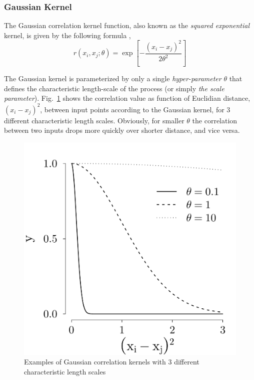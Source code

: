 
\subsubsection{Gaussian Kernel}\label{subsub:gp_gaussian_cov}

The Gaussian correlation kernel function, also known as the \emph{squared exponential} kernel, is given by the following formula \cite{Roustant2012,Santner2003,Rasmussen2006},
\begin{equation}
	r(x_i, x_j; \theta) = \exp{\left[- \frac{(x_i - x_j)^2}{2 \theta^2}\right]}
\label{eq:gaussian_kernel}
\end{equation}

The Gaussian kernel is parameterized by only a single \emph{hyper-parameter} $\theta$ that defines the characteristic length-scale of the process (or simply \emph{the scale parameter}).
Fig.~\ref{fig:plot_corrfun_gauss} shows the correlation value as function of Euclidian distance, $(x_i - x_j)^2$, between input points according to the Gaussian kernel, 
for 3 different characteristic length scales.
Obviously, for smaller $\theta$ the correlation between two inputs drops more quickly over shorter distance, and vice versa.
\begin{figure}[bth]
	\centering
	\includegraphics[scale=0.35]{../figures/chapter4/figures/plotCorrFunGauss.pdf}
	\caption[Gaussian correlation kernels with 3 different characteristic length scales]{Examples of Gaussian correlation kernels with 3 different characteristic length scales}
	\label{fig:plot_corrfun_gauss}
\end{figure}

